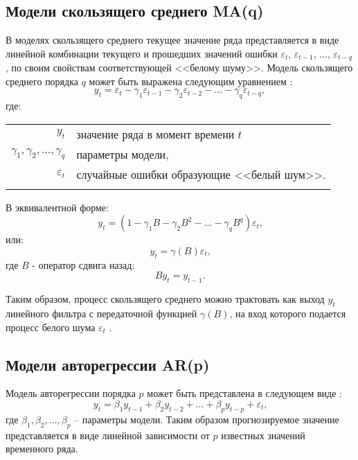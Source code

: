 \documentclass[a4paper,14pt,russian]{extreport}
\makeatletter
\newenvironment{eqwhere}
	{где:
		\par\noindent\hspace{2em}\begin{tabular}{>{$}r<{$} @{${}$ -- {}} l}
	}
	{\end{tabular}\par\vspace{\belowdisplayskip}}
\makeatother
\begin{document}
\subsection{Модели скользящего среднего MA(q)}
В моделях скользящего среднего текущее значение ряда представляется в виде 
линейной комбинации текущего и прошедших значений ошибки $\varepsilon_t$, 
$\varepsilon_{t-1}$, $...$, $\varepsilon_{t-q}$, по своим свойствам соответствующей 
<<белому шуму>>. Модель скользящего среднего порядка $q$ 
может быть выражена следующим уравнением \cite{runova2013}:
\begin{equation}
	y_t = \varepsilon_t - \gamma_1 \varepsilon_{t-1} - \gamma_2 \varepsilon_{t-2} 
		- ... - \gamma_q \varepsilon_{t-q}, 
	\nonumber
\end{equation} 
\begin{eqwhere}
	y_t	& значение ряда в момент времени $t$ \\
	\gamma_1, \gamma_2, ..., \gamma_q 	& параметры модели, \\
	\varepsilon_t	& случайные ошибки образующие <<белый шум>>.\\
	\nonumber
\end{eqwhere}
В эквивалентной форме:
\begin{equation}
	y_t = (1 - \gamma_1 B - \gamma_2 B^2 - ... - \gamma_q B^q)\varepsilon_t \text{,} 
	\nonumber
\end{equation}
или:
\begin{equation}
	y_t = \gamma(B)\varepsilon_t \text{,}  
	\nonumber
	\nonumber
\end{equation}
где $B$ - оператор сдвига назад:
\begin{equation}
	B y_t = y_{t-1} \text{.} 
	\nonumber
\end{equation}

Таким образом, процесс скользящего среднего можно трактовать как выход 
$y_t$ линейного фильтра с передаточной функцией $\gamma(B)$, на вход 
которого подается процесс белого шума $\varepsilon_t$ \cite{box2008}.


\subsection{Модели авторегрессии AR(p)}
Модель авторегрессии порядка $p$ может быть представлена в следующем 
виде \cite{runova2013}:
\begin{equation}
	y_t = \beta_1 y_{t-1} + \beta_2 y_{t-2} + ... + \beta_p y_{t-p} + \varepsilon_t \text{,} 
	\nonumber
\end{equation}
где $\beta_1, \beta_2, ..., \beta_p$ -- параметры модели. Таким образом 
прогнозируемое значение представляется в виде линейной зависимости от $p$ 
известных значений временного ряда. 
\end{document}
